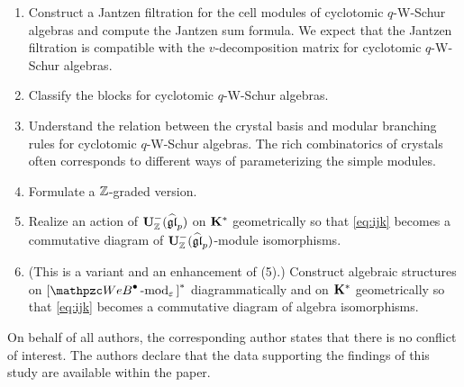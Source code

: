 \begin{enumerate}
    \item Construct a Jantzen filtration for the cell modules of cyclotomic $q$-W-Schur algebras and compute the Jantzen sum formula. 
    We expect that the Jantzen filtration is compatible with the $v$-decomposition matrix for cyclotomic $q$-W-Schur algebras. 
    \item Classify the blocks for cyclotomic $q$-W-Schur algebras. 
    \item Understand the relation between the crystal basis and modular branching rules for cyclotomic $q$-W-Schur algebras. The rich combinatorics of crystals often corresponds to different ways of parameterizing the simple modules. 
    \item Formulate a $\mathbb{Z}$-graded version.
    \item Realize an action of $\bold{U}_{\mathbb{Z}}^-(\widehat{\mathfrak{gl}}_p)$ on $\bf{K}^*$ geometrically so that 
    \eqref{eq:ijk} becomes a commutative diagram of $\bold{U}_{\mathbb{Z}}^-(\widehat{\mathfrak{gl}}_p)$-module isomorphisms. 
    \item  (This is a variant and an enhancement of (5).)  Construct algebraic structures on ${[}\qAW\modf_\eps{]}^*$ diagrammatically and on $\bf{K}^*$ geometrically so that 
    \eqref{eq:ijk} becomes a commutative diagram of algebra isomorphisms.
\end{enumerate}

On behalf of all authors, the corresponding author states that there is no conflict of interest.
The authors declare that the data supporting the findings of this study
are available within the paper.